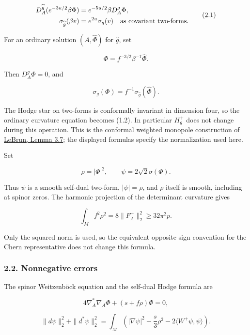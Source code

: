 \documentclass[
  10pt,
]{article}
\begin{document}
\[
 \begin{aligned}
 D_A^{\widehat g}(e^{-3u/2}\beta\Phi)
        &=e^{-5u/2}\beta D_A^g\Phi,\\
 \sigma_{\widehat g}(\beta v)&=e^{2u}\sigma_g(v)
                   \quad\hbox{as covariant two-forms}.
 \end{aligned}                                              \tag{2.1}
\]

For an ordinary solution \((A,\widehat\Phi)\) for \(\widehat g\), set

\[
                 \Phi=f^{-3/2}\beta^{-1}\widehat\Phi.
\]

Then \(D_A^g\Phi=0\), and

\[
 \sigma_g(\Phi)=f^{-1}\sigma_{\widehat g}(\widehat\Phi).
\]

The Hodge star on two-forms is conformally invariant in dimension four,
so the ordinary curvature equation becomes (1.2). In particular
\(H_g^+\) does not change during this operation. This is the conformal
weighted monopole construction of
\href{https://arxiv.org/pdf/math/0611450}{LeBrun, Lemma 3.7}; the
displayed formulas specify the normalization used here.

Set

\[
             \rho=|\Phi|^2,\qquad \psi=2\sqrt2\sigma(\Phi).
 \tag{2.2}
\]

Thus \(\psi\) is a smooth self-dual two-form, \(|\psi|=\rho\), and
\(\rho\) itself is smooth, including at spinor zeros. The harmonic
projection of the determinant curvature gives

\[
 \int_M f^2\rho^2=8\|F_A^+\|_2^2\ge32\pi^2p.           \tag{2.3}
\]

Only the squared norm is used, so the equivalent opposite sign
convention for the Chern representative does not change this formula.

\hypertarget{nonnegative-errors}{%
\subsubsection{2.2. Nonnegative errors}\label{nonnegative-errors}}

The spinor Weitzenböck equation and the self-dual Hodge formula are

\[
 4\nabla_A^*\nabla_A\Phi+(s+f\rho)\Phi=0,                \tag{2.4}
\]

\[
 \|d\psi\|_2^2+\|d^*\psi\|_2^2
   =\int_M\left(|\nabla\psi|^2+\frac{s}{3}\rho^2
                                  -2\langle W^+\psi,\psi\rangle\right).
 \tag{2.5}
\]
\end{document}
